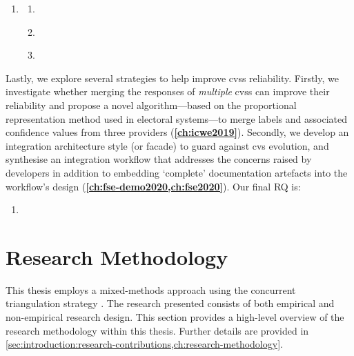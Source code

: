 \begin{leftbar}
\begin{enumerate}[label=\faQuestionCircle~~\textbf{RQ\arabic*.}, ref=RQ\arabic*, leftmargin=2.5\parindent, rightmargin=1\parindent,start=3]
  \item \textbf{\RQThreeTextDevMiscomprehension{}}\label{rq:devs}
  \begin{enumerate}[label=\textit{RQ3.\arabic*.}, ref=RQ3.\arabic*]
    \item \RQThreeTextDevMiscomprehensionIssueTypes{} \label{rq:devs:issues}
    \item \RQThreeTextDevMiscomprehensionFrustration{} \label{rq:devs:frustration}
    \item \RQThreeTextDevMiscomprehensionVsConventional{} \label{rq:devs:vs-traditional}
  \end{enumerate}
\end{enumerate}
\end{leftbar}


Lastly, we explore several strategies to help improve \glspl{cvs} reliability. Firstly, we investigate whether merging the responses of \textit{multiple} \glspl{cvs} can improve their reliability and propose a novel algorithm---based on the proportional representation method used in electoral systems---to merge labels and associated confidence values from three providers (\textbf{\cref{ch:icwe2019}}). Secondly, we develop an integration architecture style (or facade) to guard against \gls{cvs} evolution, and synthesise an integration workflow that addresses the concerns raised by developers in addition to embedding `complete' documentation artefacts into the workflow's design (\textbf{\cref{ch:fse-demo2020,ch:fse2020}}). Our final RQ is:

\begin{leftbar}
\begin{enumerate}[label=\faQuestionCircle~~\textbf{RQ\arabic*.}, ref=RQ\arabic*, leftmargin=2.5\parindent, rightmargin=1\parindent,start=4]
  \item \textbf{\RQFourDesign{}}\label{rq:design}
\end{enumerate}
\end{leftbar}

\section{Research Methodology}

This thesis employs a mixed-methods approach using the concurrent triangulation strategy \citep{Jick:1979el,Bratthall2002}. The research presented consists of both empirical and non-empirical research design. This section provides a high-level overview of the research methodology within this thesis. Further details are provided in  \cref{sec:introduction:research-contributions,ch:research-methodology}.

